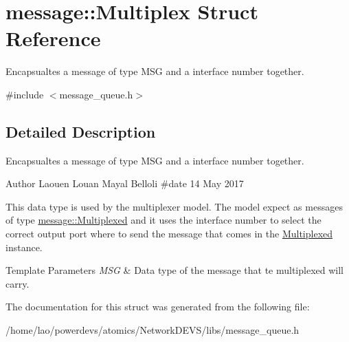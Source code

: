 \hypertarget{structmessage_1_1Multiplex}{}\section{message\+:\+:Multiplex Struct Reference}
\label{structmessage_1_1Multiplex}


Encapsualtes a message of type M\+SG and a interface number together.  




{\ttfamily \#include $<$message\+\_\+queue.\+h$>$}



\subsection{Detailed Description}
Encapsualtes a message of type M\+SG and a interface number together. 

\begin{DoxyAuthor}{Author}
Laouen Louan Mayal Belloli \#date 14 May 2017
\end{DoxyAuthor}
This data type is used by the multiplexer model. The model expect as messages of type \hyperlink{structmessage_1_1Multiplexed}{message\+::\+Multiplexed} and it uses the interface number to select the correct output port where to send the message that comes in the \hyperlink{structmessage_1_1Multiplexed}{Multiplexed} instance.


\begin{DoxyTemplParams}{Template Parameters}
{\em M\+SG} & Data type of the message that te multiplexed will carry. \\
\hline
\end{DoxyTemplParams}


The documentation for this struct was generated from the following file\+:\begin{DoxyCompactItemize}
\item 
/home/lao/powerdevs/atomics/\+Network\+D\+E\+V\+S/libs/message\+\_\+queue.\+h\end{DoxyCompactItemize}
